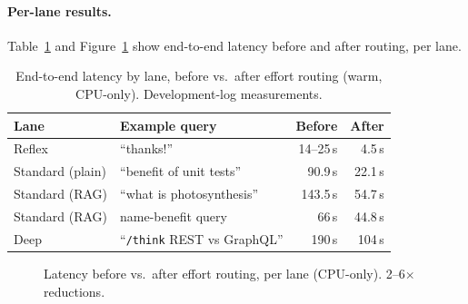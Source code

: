 \documentclass[10pt,twocolumn]{article}
\begin{document}
\paragraph{Per-lane results.}
Table~\ref{tab:results} and Figure~\ref{fig:bars} show end-to-end latency
before and after routing, per lane.

\begin{table}[t]
  \centering
  \caption{End-to-end latency by lane, before vs.\ after effort routing
  (warm, CPU-only). Development-log measurements.}
  \label{tab:results}
  \small
  \begin{tabular}{llrr}
    \toprule
    Lane & Example query & Before & After \\
    \midrule
    Reflex            & ``thanks!''                & 14--25\,s & 4.5\,s \\
    Standard (plain)  & ``benefit of unit tests''  & 90.9\,s   & 22.1\,s \\
    Standard (RAG)    & ``what is photosynthesis'' & 143.5\,s  & 54.7\,s \\
    Standard (RAG)    & name-benefit query         & 66\,s     & 44.8\,s \\
    Deep              & ``\texttt{/think} REST vs GraphQL'' & 190\,s & 104\,s \\
    \bottomrule
  \end{tabular}
\end{table}

\begin{figure}[t]
  \centering
  \caption{Latency before vs.\ after effort routing, per lane (CPU-only).
  2--6$\times$ reductions.}
  \label{fig:bars}
\end{figure}
\end{document}
